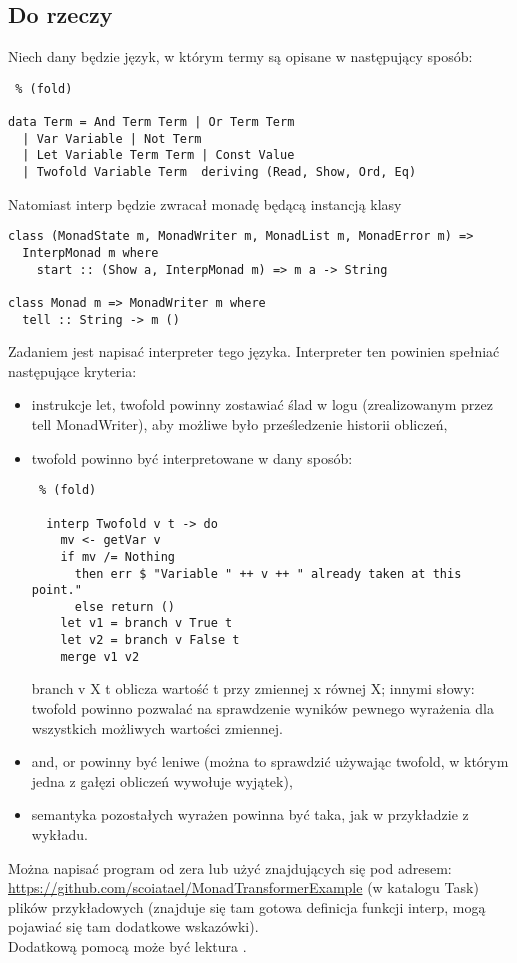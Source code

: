 \documentclass[11pt,wide]{mwart}
\begin{document}
\subsection{Do rzeczy}
Niech dany będzie język, w którym termy są opisane w następujący sposób:\begin{lstlisting} % (fold)

data Term = And Term Term | Or Term Term 
  | Var Variable | Not Term 
  | Let Variable Term Term | Const Value
  | Twofold Variable Term  deriving (Read, Show, Ord, Eq)
  \end{lstlisting}
  Natomiast interp będzie zwracał monadę będącą instancją klasy
  \begin{lstlisting}
class (MonadState m, MonadWriter m, MonadList m, MonadError m) => 
  InterpMonad m where
    start :: (Show a, InterpMonad m) => m a -> String

class Monad m => MonadWriter m where
  tell :: String -> m ()

\end{lstlisting}Zadaniem jest napisać interpreter tego języka. Interpreter ten powinien spełniać następujące kryteria:\begin{itemize}\itemsep2pt
  \item instrukcje let, twofold powinny zostawiać ślad w logu (zrealizowanym przez tell MonadWriter), aby możliwe było prześledzenie historii obliczeń,
  \item twofold powinno być interpretowane w dany sposób:\begin{lstlisting} % (fold)

  interp Twofold v t -> do
    mv <- getVar v
    if mv /= Nothing
      then err $ "Variable " ++ v ++ " already taken at this point."
      else return ()
    let v1 = branch v True t
    let v2 = branch v False t
    merge v1 v2

  \end{lstlisting}
  branch v X t oblicza wartość t przy zmiennej x równej X;
  innymi słowy: twofold powinno pozwalać na sprawdzenie wyników pewnego wyrażenia dla wszystkich możliwych wartości zmiennej.
  \item and, or powinny być leniwe (można to sprawdzić używając twofold, w którym jedna z gałęzi obliczeń wywołuje wyjątek),
  \item semantyka pozostałych wyrażen powinna być taka, jak w przykładzie z wykładu.
\end{itemize}
Można napisać program od zera lub użyć znajdujących się pod adresem:\\ \url{https://github.com/scoiatael/MonadTransformerExample} (w katalogu Task) plików przykładowych (znajduje się tam gotowa definicja funkcji interp, mogą pojawiać się tam dodatkowe wskazówki).\\
Dodatkową pomocą może być lektura \cite{mtransformer}.
\end{document}
